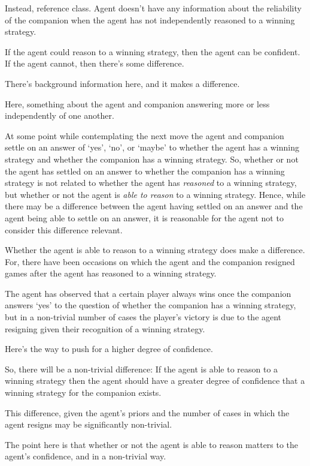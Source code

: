 \documentclass[10pt]{article}
\begin{document}
Instead, reference class.
Agent doesn't have any information about the reliability of the companion when the agent has not independently reasoned to a winning strategy.

If the agent could reason to a winning strategy, then the agent can be confident.
If the agent cannot, then there's some difference.

There's background information here, and it makes a difference.

Here, something about the agent and companion answering more or less independently of one another.

At some point while contemplating the next move the agent and companion settle on an answer of `yes', `no', or `maybe' to whether the agent has a winning strategy and whether the companion has a winning strategy.
So, whether or not the agent has settled on an answer to whether the companion has a winning strategy is not related to whether the agent has \emph{reasoned} to a winning strategy, but whether or not the agent is \emph{able to reason} to a winning strategy.
Hence, while there may be a difference between the agent having settled on an answer and the agent being able to settle on an answer, it is reasonable for the agent not to consider this difference relevant.

Whether the agent is able to reason to a winning strategy does make a difference.
For, there have been occasions on which the agent and the companion resigned games after the agent has reasoned to a winning strategy.

The agent has observed that a certain player always wins once the companion answers `yes' to the question of whether the companion has a winning strategy, but in a non-trivial number of cases the player's victory is due to the agent resigning given their recognition of a winning strategy.

\begin{note}
  Here's the way to push for a higher degree of confidence.
\end{note}

So, there will be a non-trivial difference:
If the agent is able to reason to a winning strategy then the agent should have a greater degree of confidence that a winning strategy for the companion exists.

This difference, given the agent's priors and the number of cases in which the agent resigns may be significantly non-trivial.

\begin{note}
  The point here is that whether or not the agent is able to reason matters to the agent's confidence, and in a non-trivial way.
\end{note}
\end{document}
